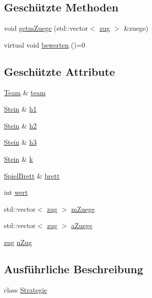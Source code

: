 \subsection*{Geschützte Methoden}
\begin{DoxyCompactItemize}
\item 
void \hyperlink{class_strategie_a0766167436598f635562bcf8b3b10430}{getm\+Zuege} (std\+::vector$<$ \hyperlink{structzug}{zug} $>$ \&zuege)
\item 
virtual void \hyperlink{class_strategie_a6e11413c1c8e4ca8bd0bcac21be3c1bf}{bewerten} ()=0
\end{DoxyCompactItemize}
\subsection*{Geschützte Attribute}
\begin{DoxyCompactItemize}
\item 
\hyperlink{class_team}{Team} \& \hyperlink{class_strategie_a4f55e74f189ec8c6df88a57119fb3def}{team}
\item 
\hyperlink{class_stein}{Stein} \& \hyperlink{class_strategie_a0b64b5969f835653965957eab7f1f5a9}{h1}
\item 
\hyperlink{class_stein}{Stein} \& \hyperlink{class_strategie_a6721c42de183333c6f49fe9724b907ae}{h2}
\item 
\hyperlink{class_stein}{Stein} \& \hyperlink{class_strategie_a82f2549dabdf1afbe888405d1adfb9e6}{h3}
\item 
\hyperlink{class_stein}{Stein} \& \hyperlink{class_strategie_abbf970c05c0033ae9f5df3766316846c}{k}
\item 
\hyperlink{class_spiel_brett}{Spiel\+Brett} \& \hyperlink{class_strategie_a2a498380f5a837cd9e5afdd9b546ed46}{brett}
\item 
int \hyperlink{class_strategie_ad0b73259d206b7114d026f7c50074554}{wert}
\item 
std\+::vector$<$ \hyperlink{structzug}{zug} $>$ \hyperlink{class_strategie_a99c5724d40dc860fc30c17a449815aa5}{m\+Zuege}
\item 
std\+::vector$<$ \hyperlink{structzug}{zug} $>$ \hyperlink{class_strategie_a6d800c6d8636540d16b41d7abf8c9ad3}{a\+Zuege}
\item 
\hyperlink{structzug}{zug} \hyperlink{class_strategie_a3f2847acbd3cd961853f0eadb6c05daf}{n\+Zug}
\end{DoxyCompactItemize}


\subsection{Ausführliche Beschreibung}
class \hyperlink{class_strategie}{Strategie}

